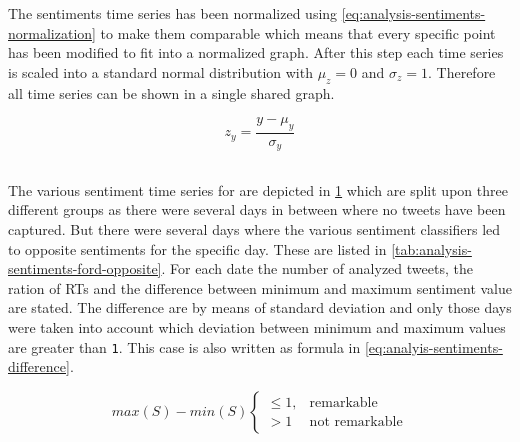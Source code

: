 The sentiments time series has been normalized using \cref{eq:analysis-sentiments-normalization} to make them comparable which means that every specific point has been modified to fit into a normalized graph.
After this step each time series is scaled into a standard normal distribution with $\mu_z = 0$ and $\sigma_z = 1$.
Therefore all time series can be shown in a single shared graph.

\begin{equation}
    z_y = \frac{y - \mu_y}{\sigma_y}
    \label{eq:analysis-sentiments-normalization}
\end{equation}


\subsection{\ford}
\label{ss:analysis-sentiments-ford}

The various sentiment time series for \ford{} are depicted in \cref{fig:analysis-sentiments-ford} which are split upon three different groups as there were several days in between where no tweets have been captured.
But there were several days where the various sentiment classifiers led to opposite sentiments for the specific day.
These are listed in \cref{tab:analysis-sentiments-ford-opposite}.
For each date the number of analyzed tweets, the ration of \acp{RT} and the difference between minimum and maximum sentiment value are stated.
The difference are by means of standard deviation and only those days were taken into account which deviation between minimum and maximum values are greater than \texttt{1}.
This case is also written as formula in \cref{eq:analyis-sentiments-difference}.

\begin{equation}
    max(S)-min(S)
    \begin{cases}
		\leq 1, & \text{remarkable} \\
		> 1  & \text{not remarkable}
    \end{cases}
    \label{eq:analyis-sentiments-difference}
\end{equation}

\begin{figure}[hbt]
    \centering
    
    \caption{\sentimentsCaption{\ford}}
    \label{fig:analysis-sentiments-ford}
\end{figure} 

